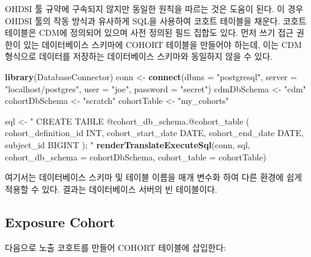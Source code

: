 \documentclass[11pt]{book}
\newenvironment{Shaded}{\begin{snugshade}}{\end{snugshade}}
\newcommand{\KeywordTok}[1]{\textcolor[rgb]{0.13,0.29,0.53}{\textbf{#1}}}
\newcommand{\DataTypeTok}[1]{\textcolor[rgb]{0.13,0.29,0.53}{#1}}
\newcommand{\StringTok}[1]{\textcolor[rgb]{0.31,0.60,0.02}{#1}}
\newcommand{\NormalTok}[1]{#1}
\theoremstyle{definition}
\theoremstyle{definition}
\theoremstyle{definition}
\theoremstyle{remark}
\begin{document}
OHDSI 툴 규약에 구속되지 않지만 동일한 원칙을 따르는 것은 도움이 된다.
이 경우 OHDSI 툴의 작동 방식과 유사하게 SQL을 사용하여 코호트 테이블을
채운다. 코호트 테이블은 CDM에 정의되어 있으며 사전 정의된 필드 집합도
있다. 먼저 쓰기 접근 권한이 있는 데이터베이스 스키마에 COHORT 테이블을
만들어야 하는데, 이는 CDM 형식으로 데이터를 저장하는 데이터베이스
스키마와 동일하지 않을 수 있다.

\begin{Shaded}
\begin{Highlighting}[]
\KeywordTok{library}\NormalTok{(DatabaseConnector)}
\NormalTok{conn <-}\StringTok{ }\KeywordTok{connect}\NormalTok{(}\DataTypeTok{dbms =} \StringTok{"postgresql"}\NormalTok{,}
                \DataTypeTok{server =} \StringTok{"localhost/postgres"}\NormalTok{,}
                \DataTypeTok{user =} \StringTok{"joe"}\NormalTok{,}
                \DataTypeTok{password =} \StringTok{"secret"}\NormalTok{)}
\NormalTok{cdmDbSchema <-}\StringTok{ "cdm"}
\NormalTok{cohortDbSchema <-}\StringTok{ "scratch"}
\NormalTok{cohortTable <-}\StringTok{ "my_cohorts"}

\NormalTok{sql <-}\StringTok{ "}
\StringTok{CREATE TABLE @cohort_db_schema.@cohort_table (}
\StringTok{  cohort_definition_id INT,}
\StringTok{  cohort_start_date DATE,}
\StringTok{  cohort_end_date DATE,}
\StringTok{  subject_id BIGINT}
\StringTok{);}
\StringTok{"}
\KeywordTok{renderTranslateExecuteSql}\NormalTok{(conn, sql,}
                          \DataTypeTok{cohort_db_schema =}\NormalTok{ cohortDbSchema,}
                          \DataTypeTok{cohort_table =}\NormalTok{ cohortTable)}
\end{Highlighting}
\end{Shaded}

여기서는 데이터베이스 스키마 및 테이블 이름을 매개 변수화 하여 다른
환경에 쉽게 적용할 수 있다. 결과는 데이터베이스 서버의 빈 테이블이다.

\subsection{Exposure Cohort}\label{exposure-cohort}

다음으로 노출 코호트를 만들어 COHORT 테이블에 삽입한다:
\end{document}
